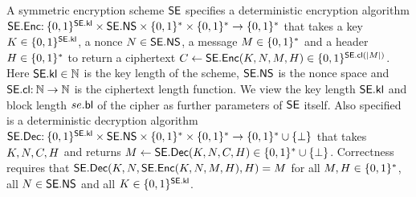 
A symmetric encryption scheme $\mathsf{SE}$ specifies a 
deterministic encryption algorithm $\mathsf{SE}.\mathsf{Enc}  \allowbreak  {:\:}  \allowbreak  \{0,1\}^{\mathsf{SE}.\mathsf{kl}}  \allowbreak \times \allowbreak   \mathsf{SE}.\mathsf{NS}  \allowbreak  \times  \allowbreak  \{0,1\}^*  \allowbreak \times \{0,1\}^* \to \{0,1\}^*$ that takes a key $K \in \{0,1\}^{\mathsf{SE}.\mathsf{kl}}$, a nonce $N \in \mathsf{SE}.\mathsf{NS}$, a message $M\in\{0,1\}^*$ and a header $H\in\{0,1\}^*$ to return a ciphertext 
$
  C \gets \allowbreak \mathsf{SE}.\mathsf{Enc}(K,\allowbreak N,\allowbreak M,H) \allowbreak \in \allowbreak \{0,1\}^{\mathsf{SE}.\mathsf{cl}(|M|)}
$.
Here $\mathsf{SE}.\mathsf{kl}\in{{\mathbb N}}$ is the key length of the scheme, $\mathsf{SE}.\mathsf{NS}$ is the nonce space and $\mathsf{SE}.\mathsf{cl}{:\:}{{\mathbb N}}\to{{\mathbb N}}$ is the ciphertext length function.  We view the key length $\mathsf{SE}.\mathsf{kl}$ and block length $se.\mathsf{bl}$ of the cipher as further parameters of $\mathsf{SE}$ itself. Also specified is a deterministic decryption algorithm $\mathsf{SE}.\mathsf{Dec} {:\:} \{0,1\}^{\mathsf{SE}.\mathsf{kl}}\times \mathsf{SE}.\mathsf{NS} \times \{0,1\}^* \times \{0,1\}^* \to \{0,1\}^*\cup\{\bot\}$  that takes $K,N,C,H$ and returns $M \gets \mathsf{SE}.\mathsf{Dec}(K,N,C,H) \in \{0,1\}^*\cup\{\bot\}$. Correctness requires that $\mathsf{SE}.\mathsf{Dec}(K,N,\mathsf{SE}.\mathsf{Enc}(K,N,M,H),H) = M$ for all $M,H \in \{0,1\}^*$, all $N\in\mathsf{SE}.\mathsf{NS}$ and all $K \in\{0,1\}^{\mathsf{SE}.\mathsf{kl}}$.


